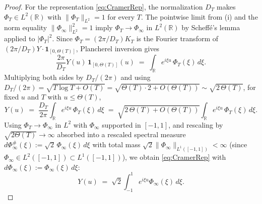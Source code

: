 \documentclass[11pt]{article}
\begin{document}
\begin{proof}
For the representation \eqref{eq:CramerRep}, the normalization $D_T$ makes $\Phi_T\in L^{2}(\mathbb R)$ with $\|\Phi_T\|_{L^{2}}=1$ for every $T$. The pointwise limit from (i) and the norm equality $\|\Phi_\infty\|_{L^{2}}^{2}=1$ imply $\Phi_T\to\Phi_\infty$ in $L^{2}(\mathbb R)$ by Scheff\'e's lemma applied to $|\Phi_T|^{2}$. Since $\Phi_T=(2\pi/D_T)K_T$ is the Fourier transform of $(2\pi/D_T)Y\cdot\mathbf 1_{[0,\Theta(T)]}$, Plancherel inversion gives
\begin{equation}\label{eq:YfromPhi}
\frac{2\pi}{D_T}Y(u)\,\mathbf 1_{[0,\Theta(T)]}(u)\;=\;\int_{\mathbb R}e^{i\xi u}\,\Phi_T(\xi)\,d\xi.
\end{equation}
Multiplying both sides by $D_T/(2\pi)$ and using $D_T/(2\pi)=\sqrt{T\log T+O(T)}=\sqrt{\Theta(T)\cdot 2+O(\Theta(T))}\sim\sqrt{2\,\Theta(T)}$, for fixed $u$ and $T$ with $u\le\Theta(T)$,
\[
Y(u)\;=\;\frac{D_T}{2\pi}\int_{\mathbb R}e^{i\xi u}\,\Phi_T(\xi)\,d\xi\;=\;\sqrt{2\,\Theta(T)+O(\Theta(T))}\int_{\mathbb R}e^{i\xi u}\,\Phi_T(\xi)\,d\xi.
\]
Using $\Phi_T\to\Phi_\infty$ in $L^{2}$ with $\Phi_\infty$ supported in $[-1,1]$, and rescaling by $\sqrt{2\Theta(T)}\to\infty$ absorbed into a rescaled spectral measure $d\Phi_\infty^{\#}(\xi):=\sqrt{2}\,\Phi_\infty(\xi)\,d\xi$ with total mass $\sqrt{2}\|\Phi_\infty\|_{L^{1}([-1,1])}<\infty$ (since $\Phi_\infty\in L^{2}([-1,1])\subset L^{1}([-1,1])$), we obtain \eqref{eq:CramerRep} with $d\Phi_\infty(\xi):=\Phi_\infty(\xi)\,d\xi$:
\[
Y(u)\;=\;\sqrt{2}\int_{-1}^{1}e^{i\xi u}\Phi_\infty(\xi)\,d\xi.
\]
\end{proof}
\end{document}

